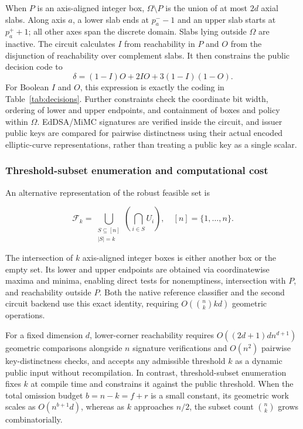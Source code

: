 When $P$ is an axis-aligned integer box, $\Omega\setminus P$ is the union of at most $2d$ axial slabs. Along axis $a$, a lower slab ends at $p_a^- -1$ and an upper slab starts at $p_a^+ +1$; all other axes span the discrete domain. Slabs lying outside $\Omega$ are inactive. The circuit calculates $I$ from reachability in $P$ and $O$ from the disjunction of reachability over complement slabs. It then constrains the public decision code to
\begin{equation}\label{eq:decisioncode}
\delta=(1-I)O+2IO+3(1-I)(1-O).
\end{equation}
For Boolean $I$ and $O$, this expression is exactly the coding in Table~\ref{tab:decisions}. Further constraints check the coordinate bit width, ordering of lower and upper endpoints, and containment of boxes and policy within $\Omega$. EdDSA/MiMC signatures are verified inside the circuit, and issuer public keys are compared for pairwise distinctness using their actual encoded elliptic-curve representations, rather than treating a public key as a single scalar.

\subsubsection{Threshold-subset enumeration and computational cost}
An alternative representation of the robust feasible set is

\begin{equation}\label{eq:subset}
\mathcal{F}_k = \bigcup_{\substack{S \subseteq [n] \\ |S| = k}} \left( \bigcap_{i \in S} U_i \right), \quad [n] = \{1, \dots, n\}.
\end{equation}


The intersection of $k$ axis-aligned integer boxes is either another box or the empty set. Its lower and upper endpoints are obtained via coordinatewise maxima and minima, enabling direct tests for nonemptiness, intersection with $P$, and reachability outside $P$. Both the native reference classifier and the second circuit backend use this exact identity, requiring $O(\binom{n}{k}kd)$ geometric operations.

For a fixed dimension $d$, lower-corner reachability requires $O((2d + 1)dn^{d+1})$ geometric comparisons alongside $n$ signature verifications and $O(n^2)$ pairwise key-distinctness checks, and accepts any admissible threshold $k$ as a dynamic public input without recompilation. In contrast, threshold-subset enumeration fixes $k$ at compile time and constrains it against the public threshold. When the total omission budget $b = n - k = f + r$ is a small constant, its geometric work scales as $O(n^{b+1}d)$, whereas as $k$ approaches $n/2$, the subset count $\binom{n}{k}$ grows combinatorially.

